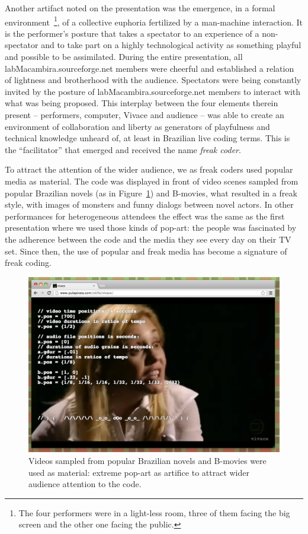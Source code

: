 \documentclass[letterpaper, 12pt]{article}
\begin{document}
Another artifact noted on the presentation was the emergence, in a
formal environment~\footnote{The four performers were in a light-less
  room, three of them facing the big screen and the other one facing
  the public.}, of a collective euphoria fertilized by a man-machine
interaction. It is the performer's posture that takes a spectator to
an experience of a non-spectator and to take part on a highly
technological activity as something playful and possible to be
assimilated.  During the entire presentation, all
labMacambira.sourceforge.net members were cheerful and established a
relation of lightness and brotherhood with the audience.  Spectators
were being constantly invited by the posture of
labMacambira.sourceforge.net members to interact with what was being
proposed.  This interplay between the four elements therein present --
performers, computer, Vivace and audience -- was able to create an
environment of collaboration and liberty as generators of playfulness
and technical knowledge unheard of, at least in Brazilian live coding
terms. This is the ``facilitator'' that emerged and received the name
\emph{freak coder}.

To attract the attention of the wider audience, we as freak coders
used popular media as material. The code was displayed in front of
video scenes sampled from popular Brazilian novels (as in
Figure~\ref{fig:novela}) and B-movies, what resulted in a freak style,
with images of monsters and funny dialogs between novel actors. In
other performances for heterogeneous attendees the effect was the same
as the first presentation where we used those kinds of pop-art: the
people was fascinated by the adherence between the code and the media
they see every day on their TV set. Since then, the use of popular and
freak media has become a signature of freak coding.

\begin{figure}[htpb]
  \begin{center}
    \includegraphics[scale=.3]{img/fig_novela.png}
    \caption{Videos sampled from popular Brazilian novels and B-movies
      were used as material: extreme pop-art as artifice to attract
      wider audience attention to the code.}
    \label{fig:novela}
  \end{center}
\end{figure}
\end{document}
